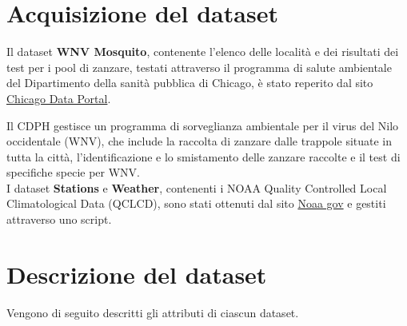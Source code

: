 \section{Acquisizione del dataset}
Il dataset \textbf{WNV Mosquito}, contenente l'elenco delle località e dei risultati dei test per i pool di zanzare, testati attraverso il programma di salute ambientale del Dipartimento della sanità pubblica di Chicago, è stato reperito dal sito \href{https://data.cityofchicago.org/Health-Human-Services/West-Nile-Virus-WNV-Mosquito-Test-Results/jqe8-8r6s/data}{Chicago Data Portal}.

Il CDPH gestisce un programma di sorveglianza ambientale per il virus del Nilo occidentale (WNV), che include la raccolta di zanzare dalle trappole situate in tutta la città, l'identificazione e lo smistamento delle zanzare raccolte e il test di specifiche specie per WNV.\\

I dataset \textbf{Stations} e \textbf{Weather}, contenenti i NOAA Quality Controlled Local Climatological Data (QCLCD), sono stati ottenuti dal sito \href{https://www.ncdc.noaa.gov/orders/qclcd/}{Noaa gov} e gestiti attraverso uno script. 


\section{Descrizione del dataset}
Vengono di seguito descritti gli attributi di ciascun dataset.

